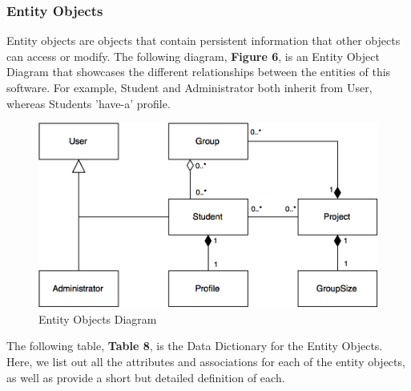 \documentclass[12pt,letterpaper]{article}
\begin{document}
\subsubsection*{Entity Objects}

Entity objects are objects that contain persistent information that other objects can access or modify. The following diagram, {\bf Figure 6}, is an Entity Object Diagram
that showcases the different relationships between the entities of this software. For example, Student and Administrator both inherit from User, whereas Students 'have-a'
profile.

\begin{figure}[H]
	\centering{}
	\includegraphics[scale=0.35]{imgs/entity-object-diagram.png}
	\caption{Entity Objects Diagram}
\end{figure}

The following table, {\bf Table 8}, is the Data Dictionary for the Entity Objects. Here, we list out all the attributes and associations for each of the entity objects, as well as provide
a short but detailed definition of each.
\end{document}
